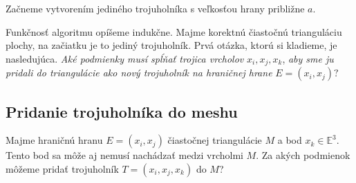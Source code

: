 Začneme vytvorením jediného trojuholníka s veľkosťou hrany približne $a$.

Funkčnosť algoritmu opíšeme indukčne. Majme korektnú čiastočnú trianguláciu plochy, na začiatku
je to jediný trojuholník. Prvá otázka, ktorú si kladieme, je nasledujúca. 
\textit{Aké podmienky musí spĺňať trojica vrcholov} $x_i, x_j, x_k$, 
\textit{aby sme ju pridali do triangulácie ako nový trojuholník na hraničnej hrane} $E = (x_i, x_j)?$ 

\subsection{Pridanie trojuholníka do meshu}
\label{kap:triangle_conditions}

Majme hraničnú hranu $E=(x_i, x_j)$ čiastočnej triangulácie $M$ a bod $x_k \in \mathbb{E}^3$. 
Tento bod sa môže aj nemusí nachádzať medzi vrcholmi $M$. Za akých podmienok môžeme pridať trojuholník 
$T=(x_i, x_j, x_k)$ do $M$?

